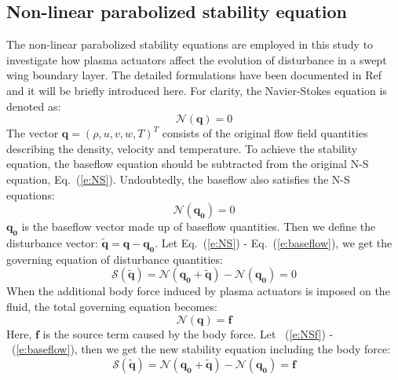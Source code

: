 \documentclass{AIAA}
\begin{document}
\subsection{Non-linear parabolized stability equation}
The non-linear parabolized stability equations are employed in this study to investigate how plasma actuators affect the evolution of disturbance in a swept wing boundary layer. The detailed formulations have been documented in Ref \cite{wzf17} and it will be briefly introduced here. For clarity, the Navier-Stokes equation is denoted as:
\begin{equation}
    \label{e:NS}
    \mathscr{N}(\mathbf{q})=0
\end{equation}
The vector $\mathbf{q}=(\rho , u,v,w,T)^T$ consists of the original flow field quantities describing the density, velocity and temperature. To achieve the stability equation, the baseflow equation should be subtracted from the original N-S equation, Eq.~(\ref{e:NS}). Undoubtedly, the baseflow also satisfies the N-S equations:
\begin{equation}
    \label{e:baseflow}
    \mathscr{N}(\mathbf{q_0})=0
\end{equation}
$\mathbf{q_0}$ is the baseflow vector made up of baseflow quantities. Then we define the disturbance vector: $\mathbf{\tilde{q}}=\mathbf{q}-\mathbf{q_0}$. Let Eq.~(\ref{e:NS}) - Eq.~(\ref{e:baseflow}), we get the governing equation of disturbance quantities:
\begin{equation}
    \label{e:disturbance1}
    \mathscr{S}(\mathbf{\tilde{q}})=\mathscr{N}(\mathbf{q_0}+\mathbf{\tilde{q}})-\mathscr{N}(\mathbf{q_0})=0
\end{equation}
When the additional body force induced by plasma actuators is imposed on the fluid, the total governing equation becomes:
\begin{equation}
    \label{e:NSf}
    \mathscr{N}(\mathbf{q})=\mathbf{f}
\end{equation}
Here, $\mathbf{f}$ is the source term caused by the body force. Let ~(\ref{e:NSf}) -~(\ref{e:baseflow}), then we get the new stability equation including the body force:
\begin{equation}
    \label{e:disturbance2}
    \mathscr{S}(\mathbf{\tilde{q}})=\mathscr{N}(\mathbf{q_0}+\mathbf{\tilde{q}})-\mathscr{N}(\mathbf{q_0})=\mathbf{f}
\end{equation}
\end{document}
